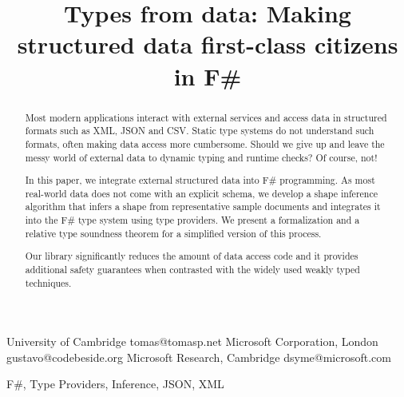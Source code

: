 \documentclass[10pt,preprint,clearpagebib]{sigplanconf}
\newcommand{\doi}[1]{doi:~\href{http://dx.doi.org/#1}{\Hurl{#1}}}
\begin{document}
\setlength{\pdfpageheight}{\paperheight}
\setlength{\pdfpagewidth}{\paperwidth}


\title{Types from data: \textnormal{Making structured data first-class citizens in F\#}}

           {University of Cambridge}
           {tomas@tomasp.net}
           {Microsoft Corporation, London}
           {gustavo@codebeside.org}
           {Microsoft Research, Cambridge}
           {dsyme@microsoft.com}
\maketitle


\begin{abstract}
Most modern applications interact with external services and access data in structured formats such 
as XML, JSON and CSV. Static type systems do not understand such formats, often making data access
more cumbersome. Should we give up and leave the messy world of external data to dynamic typing 
and runtime checks? Of course, not!

In this paper, we integrate external structured data into F\# programming. As most real-world data
does not come with an explicit schema, we develop a shape inference algorithm that infers a shape from 
representative sample documents and integrates it into the F\# type system using type providers.
We present a formalization and a relative type soundness theorem for a simplified version of this process.

Our library significantly reduces the amount of data access code and it provides additional 
safety guarantees when contrasted with the widely used weakly typed techniques.
\end{abstract}

\keywords F\#, Type Providers, Inference, JSON, XML
\end{document}
